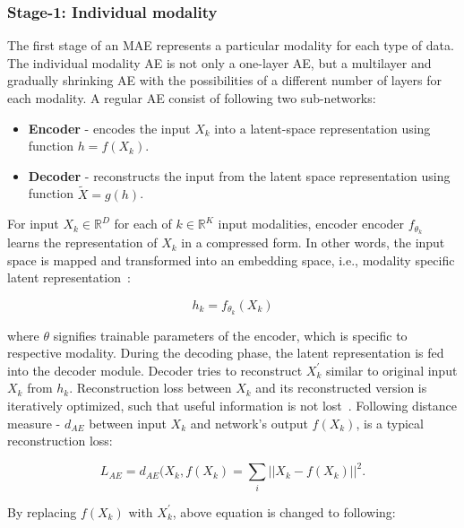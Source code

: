 \subsubsection{Stage-1: Individual modality}
The first stage of an MAE represents a particular modality for each type of data. The individual modality AE is not only a one-layer AE, but a multilayer and gradually shrinking AE with the possibilities of a different number of layers for each modality. A regular AE consist of following two sub-networks: 

\begin{itemize}[noitemsep]
    \item \textbf{Encoder} - encodes the input $X_{k}$ into a latent-space representation using function $h = f(X_{k})$.
    \item \textbf{Decoder} - reconstructs the input from the latent space representation using function $\tilde{X} = g(h)$. 
\end{itemize}

\hspace*{3.5mm} For input $X_{k} \in \mathbb{R}^{D}$ for each of $k \in \mathbb{R}^K$ input modalities, encoder encoder $f_{\theta_{k}}$ learns the representation of $X_{k}$ in a compressed form. In other words, the input space is mapped and transformed into an embedding space, i.e., modality specific latent representation~\cite{mmdcae}: 

\begin{equation}
    h_{k}=f_{\theta_{k}}\left({X}_{k}\right)
\end{equation}

\hspace*{3.5mm} where $\theta$ signifies trainable parameters of the encoder, which is specific to respective modality. During the decoding phase, the latent representation is fed into the decoder module. Decoder tries to reconstruct ${X}_{k}^{\prime}$ similar to original input ${X}_{k}$ from $h_{k}$. Reconstruction loss between $X_{k}$ and its reconstructed version is iteratively optimized, such that useful information is not lost~\cite{KarimIEEEAccess2019}. Following distance measure - $d_{AE}$ between input $X_{k}$ and network's output $f(X_{k})$, is a typical reconstruction loss: 

\begin{equation}
    L_{AE}=\text{$d_{AE}$}(X_{k}, f(X_{k}) = \sum_{i} ||X_{k}-f(X_{k})||^{2}.
\end{equation}

\hspace*{3.5mm} By replacing $f(X_{k})$ with ${X}_{k}^{\prime}$, above equation is changed to following: 

